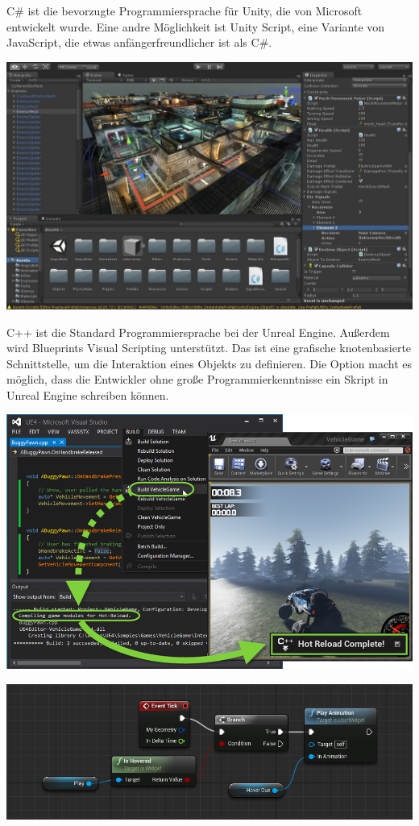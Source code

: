   C\# ist die bevorzugte Programmiersprache für Unity, die von Microsoft entwickelt wurde. Eine andre Möglichkeit ist Unity Script, eine Variante von JavaScript, die etwas anfängerfreundlicher ist als C\#.
  
  \includegraphics[width=\textwidth]{images/unity.jpg}
  
  C++ ist die Standard Programmiersprache bei der Unreal Engine. Außerdem wird Blueprints Visual Scripting unterstützt. Das ist eine grafische knotenbasierte Schnittstelle, um die Interaktion eines Objekts zu definieren. Die Option macht es möglich, dass die Entwickler ohne große Programmierkenntnisse ein Skript in Unreal Engine schreiben können.
  
  \includegraphics[width=\textwidth]{images/uec.png}
  
  \includegraphics[width=\textwidth]{images/ueblueprint.png}
  
